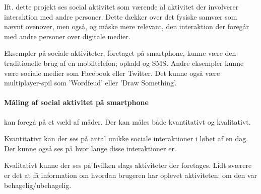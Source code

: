 Ift. dette projekt ses social aktivitet som værende al aktivitet der involverer interaktion med andre personer.
Dette dækker over det fysiske samvær som nævnt ovenover, men også, og måske mere relevant, den interaktion der foregår med andre personer over digitale medier.

Eksempler på sociale aktiviteter, foretaget på smartphone, kunne være den traditionelle brug af en mobiltelefon; opkald og SMS.
Andre eksempler kunne være sociale medier som Facebook eller Twitter.
Det kunne også være multiplayer-spil som 'Wordfeud' eller 'Draw Something'.

\paragraph{Måling af social aktivitet på smartphone} kan foregå på et væld af måder.
Der kan måles både kvantitativt og kvalitativt.

Kvantitativt kan der ses på antal unikke sociale interaktioner i løbet af en dag.
Der kunne også ses på hvor lange disse interaktioner er.

Kvalitativt kunne der ses på hvilken slags aktiviteter der foretages.
Lidt sværere er det at få information om hvordan brugeren har oplevet aktiviteten; om den var behagelig/ubehagelig.
